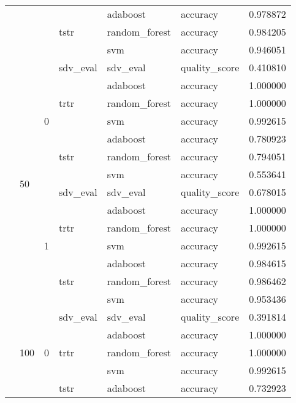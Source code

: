 \begin{longtable}{llllllr}
\cline{4-7} \cline{5-7}
 &  &  & \multirow[t]{3}{*}{tstr} & adaboost & accuracy & 0.978872 \\
\cline{5-7}
 &  &  &  & random_forest & accuracy & 0.984205 \\
\cline{5-7}
 &  &  &  & svm & accuracy & 0.946051 \\
\cline{2-7} \cline{3-7} \cline{4-7} \cline{5-7}
 & \multirow[t]{14}{*}{50} & \multirow[t]{7}{*}{0} & sdv_eval & sdv_eval & quality_score & 0.410810 \\
\cline{4-7} \cline{5-7}
 &  &  & \multirow[t]{3}{*}{trtr} & adaboost & accuracy & 1.000000 \\
\cline{5-7}
 &  &  &  & random_forest & accuracy & 1.000000 \\
\cline{5-7}
 &  &  &  & svm & accuracy & 0.992615 \\
\cline{4-7} \cline{5-7}
 &  &  & \multirow[t]{3}{*}{tstr} & adaboost & accuracy & 0.780923 \\
\cline{5-7}
 &  &  &  & random_forest & accuracy & 0.794051 \\
\cline{5-7}
 &  &  &  & svm & accuracy & 0.553641 \\
\cline{3-7} \cline{4-7} \cline{5-7}
 &  & \multirow[t]{7}{*}{1} & sdv_eval & sdv_eval & quality_score & 0.678015 \\
\cline{4-7} \cline{5-7}
 &  &  & \multirow[t]{3}{*}{trtr} & adaboost & accuracy & 1.000000 \\
\cline{5-7}
 &  &  &  & random_forest & accuracy & 1.000000 \\
\cline{5-7}
 &  &  &  & svm & accuracy & 0.992615 \\
\cline{4-7} \cline{5-7}
 &  &  & \multirow[t]{3}{*}{tstr} & adaboost & accuracy & 0.984615 \\
\cline{5-7}
 &  &  &  & random_forest & accuracy & 0.986462 \\
\cline{5-7}
 &  &  &  & svm & accuracy & 0.953436 \\
\cline{2-7} \cline{3-7} \cline{4-7} \cline{5-7}
 & \multirow[t]{14}{*}{100} & \multirow[t]{7}{*}{0} & sdv_eval & sdv_eval & quality_score & 0.391814 \\
\cline{4-7} \cline{5-7}
 &  &  & \multirow[t]{3}{*}{trtr} & adaboost & accuracy & 1.000000 \\
\cline{5-7}
 &  &  &  & random_forest & accuracy & 1.000000 \\
\cline{5-7}
 &  &  &  & svm & accuracy & 0.992615 \\
\cline{4-7} \cline{5-7}
 &  &  & \multirow[t]{3}{*}{tstr} & adaboost & accuracy & 0.732923 \\

\end{longtable}
